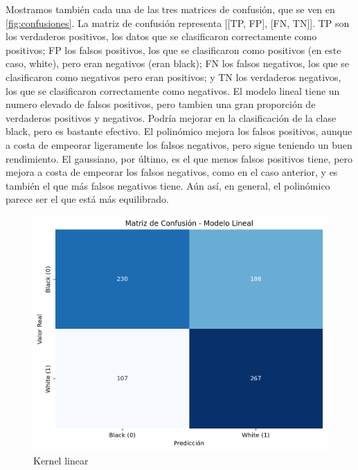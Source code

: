 \documentclass[a4paper,onecolumn]{extarticle}
\begin{document}
\begin{sloppypar}
Mostramos también cada una de las tres matrices de confusión, que se ven en \ref{fig:confusiones}. La matriz de confusión representa [[TP, FP], [FN, TN]]. TP son 
los verdaderos positivos, los datos que se clasificaron correctamente como positivos; FP los falsos positivos, los que se clasificaron como positivos (en este caso,
white), pero eran negativos (eran black); FN los falsos negativos, los que se clasificaron como negativos pero eran positivos; y TN los verdaderos negativos, los 
que se clasificaron correctamente como negativos. El modelo lineal tiene un numero elevado de falsos positivos, pero tambien una gran proporción de verdaderos 
positivos y negativos. Podría mejorar en la clasificación de la clase black, pero es bastante efectivo. El polinómico mejora los falsos positivos, aunque a costa 
de empeorar ligeramente los falsos negativos, pero sigue teniendo un buen rendimiento. El gaussiano, por último, es el que menos falsos positivos tiene, pero 
mejora a costa de empeorar los falsos negativos, como en el caso anterior, y es también el que más falsos negativos tiene. Aún así, en general, el polinómico 
parece ser el que está más equilibrado.
\begin{figure}[h!]
    \centering
    \begin{minipage}[b]{0.3\textwidth}
        \centering
        \includegraphics[width=\textwidth]{imgs/confLin.png}
        \caption{Kernel linear}
    \end{minipage}%
    \hspace{1em}  %
    \begin{minipage}[b]{0.3\textwidth}

\end{minipage}
\end{figure}
\end{sloppypar}
\end{document}
